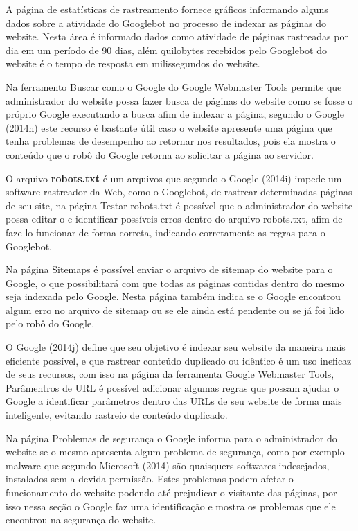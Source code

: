 \documentclass[
	12pt,				%
	openright,			%
	twoside,			%
	a4paper,			%
	english,			%
	french,				%
	spanish,			%
	brazil				%
	]{abntex2}
\begin{document}
A página de estatísticas de rastreamento fornece gráficos informando alguns dados sobre a atividade do Googlebot no processo de indexar as páginas do website. Nesta área é informado dados como atividade de páginas rastreadas por dia em um período de 90 dias, além quilobytes recebidos pelo Googlebot do website é o tempo de resposta em milissegundos do website.

Na ferramento Buscar como o Google do Google Webmaster Tools permite que administrador do website possa fazer busca de páginas do website como se fosse o próprio Google executando a busca afim de indexar a página, segundo o Google (2014h) este recurso é bastante útil caso o website apresente uma página que tenha problemas de desempenho ao retornar nos resultados, pois ela mostra o conteúdo que o robô do Google retorna ao solicitar a página ao servidor.

O arquivo \textbf{robots.txt} é um arquivos que segundo o Google (2014i) impede um software rastreador da Web, como o Googlebot, de rastrear determinadas páginas de seu site, na página Testar robots.txt é possível que o administrador do website possa editar o e identificar possíveis erros dentro do arquivo robots.txt, afim de faze-lo funcionar de forma correta, indicando corretamente as regras para o Googlebot.

Na página Sitemaps é possível enviar o arquivo de sitemap do website para o Google, o que possibilitará com que todas as páginas contidas dentro do mesmo seja indexada pelo Google. Nesta página também indica se o Google encontrou algum erro no arquivo de sitemap ou se ele ainda está pendente ou se já foi lido pelo robô do Google.

O Google (2014j) define que seu objetivo é indexar seu website da maneira mais eficiente possível, e que rastrear conteúdo duplicado ou idêntico é um uso ineficaz de seus recursos, com isso na página da ferramenta Google Webmaster Tools, Parâmentros de URL é possível adicionar algumas regras que possam ajudar o Google a identificar parâmetros dentro das URLs de seu website de forma mais inteligente, evitando rastreio de conteúdo duplicado.

Na página Problemas de segurança o Google informa para o administrador do website se o mesmo apresenta algum problema de segurança, como por exemplo malware que segundo Microsoft (2014) são quaisquers softwares indesejados, instalados sem a devida permissão. Estes problemas podem afetar o funcionamento do website podendo até prejudicar o visitante das páginas, por isso nessa seção o Google faz uma identificação e mostra os problemas que ele encontrou na segurança do website.
\end{document}
